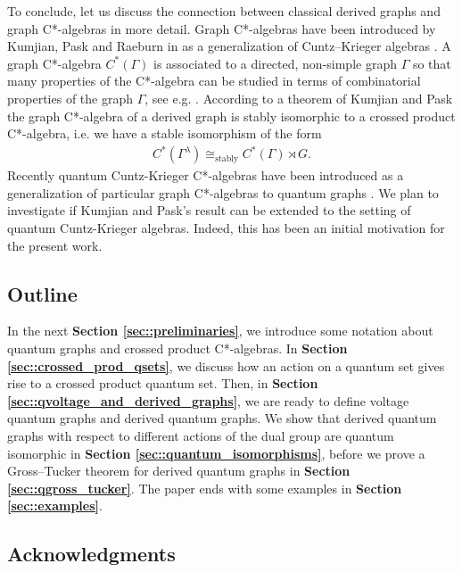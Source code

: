 \documentclass{amsart}
\theoremstyle{definition}
\theoremstyle{definition}
\begin{document}
To conclude, let us discuss the connection between classical derived graphs and graph C*-algebras in more detail. Graph C*-algebras have been introduced by Kumjian, Pask and Raeburn in \cite{kumjian_graphs_1997} as a generalization of Cuntz--Krieger algebras \cite{cuntz_class_1980}. 
A graph C*-algebra $C^\ast(\Gamma)$ is associated to a directed, non-simple graph $\Gamma$ so that many properties of the C*-algebra can be studied in terms of combinatorial properties of the graph $\Gamma$, see e.g. \cite{raeburn_graph_2005}. 
According to a theorem of Kumjian and Pask \cite{kumjian_c-algebras_1999} the graph C*-algebra of a derived graph is stably isomorphic to a crossed product C*-algebra, i.e. we have a stable isomorphism of the form
\begin{align*}
    C^\ast(\Gamma^\lambda) \cong_{\mathrm{stably}} C^\ast(\Gamma) \rtimes G.
\end{align*} 
Recently quantum Cuntz-Krieger C*-algebras have been introduced as a generalization of particular graph C*-algebras to quantum graphs \cite{brannan_quantum_CuntzKrieger_2022, brannan_quantum_edge_2022}. We plan to investigate if Kumjian and Pask's result can be extended to the setting of quantum Cuntz-Krieger algebras. Indeed, this has been an initial motivation for the present work.

\subsection{Outline}

In the next \textbf{Section \ref{sec::preliminaries}}, we introduce some notation about quantum graphs and crossed product C*-algebras. In \textbf{Section \ref{sec::crossed_prod_qsets}}, we discuss how an action on a quantum set gives rise to a crossed product quantum set. Then, in \textbf{Section \ref{sec::qvoltage_and_derived_graphs}}, we are ready to define voltage quantum graphs and derived quantum graphs. We show that derived quantum graphs with respect to different actions of the dual group are quantum isomorphic in \textbf{Section \ref{sec::quantum_isomorphisms}}, before we prove a Gross--Tucker theorem for derived quantum graphs in \textbf{Section \ref{sec::qgross_tucker}}. The paper ends with some examples in \textbf{Section \ref{sec::examples}}.

\subsection{Acknowledgments}
\end{document}
